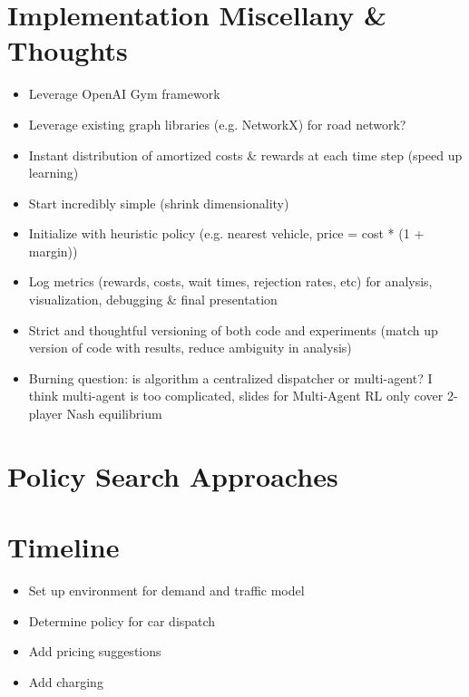\documentclass[12pt]{article}
\begin{document}
\section*{Implementation Miscellany \& Thoughts}
\begin{itemize}
		\item Leverage OpenAI Gym framework
		\item Leverage existing graph libraries (e.g. NetworkX) for road network?
		\item Instant distribution of amortized costs \& rewards at each time step (speed up learning)
		\item Start incredibly simple (shrink dimensionality)
		\item Initialize with heuristic policy (e.g. nearest vehicle, price = cost * (1 + margin))
		\item Log metrics (rewards, costs, wait times, rejection rates, etc) for analysis,
				visualization, debugging \& final presentation
		\item Strict and thoughtful versioning of both code and experiments (match up version
				of code with results, reduce ambiguity in analysis)
		\item Burning question: is algorithm a centralized dispatcher or multi-agent? I think
				multi-agent is too complicated, slides for Multi-Agent RL only cover 2-player Nash equilibrium
\end{itemize}

\section*{Policy Search Approaches}

		\section*{Timeline}
		\begin{itemize}
    \item Set up environment for demand and traffic model
    \item Determine policy for car dispatch
    \item Add pricing suggestions
    \item Add charging
		\end{itemize}

		
\end{document}
